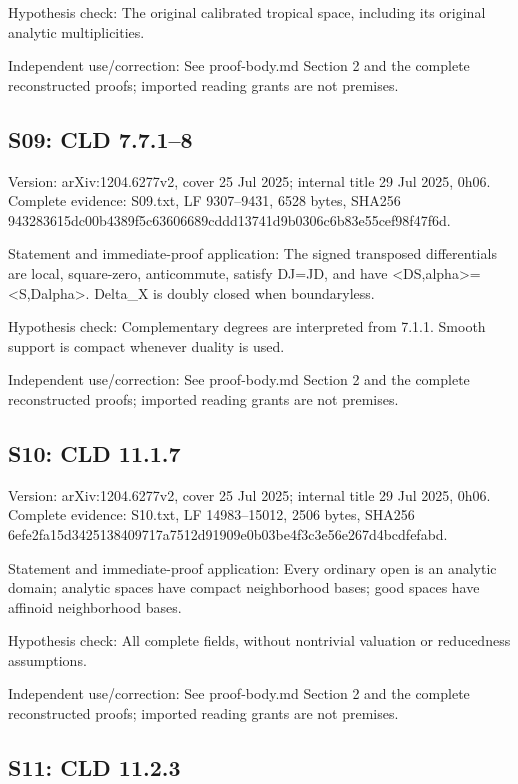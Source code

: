 \documentclass[11pt]{article}
\begin{document}
Hypothesis check: The original calibrated tropical space, including its original analytic multiplicities.

Independent use/correction: See proof-body.md Section 2 and the complete reconstructed proofs; imported reading grants are not premises.

\subsection{S09: CLD 7.7.1--8}

Version: arXiv:1204.6277v2, cover 25 Jul 2025; internal title 29 Jul 2025, 0h06. Complete evidence: S09.txt, LF 9307--9431, 6528 bytes, SHA256 943283615dc00b4389f5c63606689cddd13741d9b0306c6b83e55cef98f47f6d.

Statement and immediate-proof application: The signed transposed differentials are local, square-zero, anticommute, satisfy DJ=JD, and have <DS,alpha>=<S,Dalpha>. Delta\_X is doubly closed when boundaryless.

Hypothesis check: Complementary degrees are interpreted from 7.1.1. Smooth support is compact whenever duality is used.

Independent use/correction: See proof-body.md Section 2 and the complete reconstructed proofs; imported reading grants are not premises.

\subsection{S10: CLD 11.1.7}

Version: arXiv:1204.6277v2, cover 25 Jul 2025; internal title 29 Jul 2025, 0h06. Complete evidence: S10.txt, LF 14983--15012, 2506 bytes, SHA256 6efe2fa15d3425138409717a7512d91909e0b03be4f3c3e56e267d4bcdfefabd.

Statement and immediate-proof application: Every ordinary open is an analytic domain; analytic spaces have compact neighborhood bases; good spaces have affinoid neighborhood bases.

Hypothesis check: All complete fields, without nontrivial valuation or reducedness assumptions.

Independent use/correction: See proof-body.md Section 2 and the complete reconstructed proofs; imported reading grants are not premises.

\subsection{S11: CLD 11.2.3}
\end{document}
